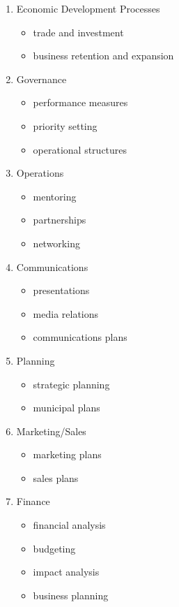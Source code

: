 \documentclass[11pt,letterpaper,oneside,openany]{book}
\begin{document}
\begin{enumerate}
\item Economic Development Processes
\begin{itemize}
\item trade and investment
\item business retention and expansion
\end{itemize}

\item Governance
\begin{itemize}
\item performance measures
\item priority setting
\item operational structures
\end{itemize}

\item Operations
\begin{itemize}
\item mentoring
\item partnerships
\item networking
\end{itemize}

\item Communications
\begin{itemize}
\item presentations
\item media relations
\item communications plans
\end{itemize}

\item Planning
\begin{itemize}
\item strategic planning
\item municipal plans
\end{itemize}

\item Marketing/Sales
\begin{itemize}
\item marketing plans
\item sales plans
\end{itemize}

\item Finance
\begin{itemize}
\item financial analysis
\item budgeting
\item impact analysis
\item business planning
\end{itemize}

\end{enumerate}
\end{document}
